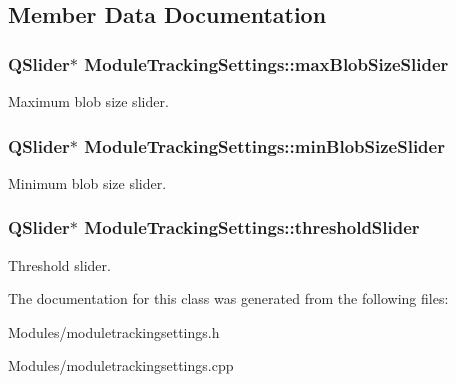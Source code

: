 \subsection{Member Data Documentation}
\hypertarget{class_module_tracking_settings_afce5251cab4676b1310137de238ce5bf}{
\subsubsection[{maxBlobSizeSlider}]{\setlength{\rightskip}{0pt plus 5cm}QSlider$\ast$ {\bf ModuleTrackingSettings::maxBlobSizeSlider}}}
\label{db/d02/class_module_tracking_settings_afce5251cab4676b1310137de238ce5bf}
Maximum blob size slider. \hypertarget{class_module_tracking_settings_a914d364028bc30f8b30d9fd29db324cb}{
\subsubsection[{minBlobSizeSlider}]{\setlength{\rightskip}{0pt plus 5cm}QSlider$\ast$ {\bf ModuleTrackingSettings::minBlobSizeSlider}}}
\label{db/d02/class_module_tracking_settings_a914d364028bc30f8b30d9fd29db324cb}
Minimum blob size slider. \hypertarget{class_module_tracking_settings_a9fccb78201d95f38a9006774335cf55d}{
\subsubsection[{thresholdSlider}]{\setlength{\rightskip}{0pt plus 5cm}QSlider$\ast$ {\bf ModuleTrackingSettings::thresholdSlider}}}
\label{db/d02/class_module_tracking_settings_a9fccb78201d95f38a9006774335cf55d}
Threshold slider. 

The documentation for this class was generated from the following files:\begin{DoxyCompactItemize}
\item 
Modules/moduletrackingsettings.h\item 
Modules/moduletrackingsettings.cpp\end{DoxyCompactItemize}
